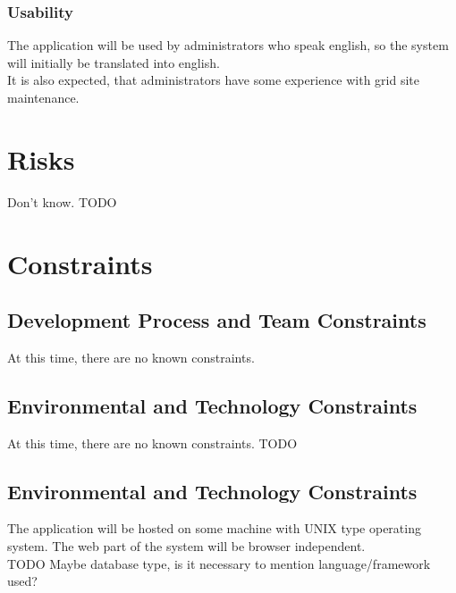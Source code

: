 \documentclass[12pt]{article}
\begin{document}
\subsubsection{Usability}
The application will be used by administrators who speak english, so the system will initially be translated into english.\\
It is also expected, that administrators have some experience with grid site maintenance.


\section{Risks}
Don't know. TODO


\section{Constraints}

\subsection{Development Process and Team Constraints}
At this time, there are no known constraints.

\subsection{Environmental and Technology Constraints}
At this time, there are no known constraints. TODO

\subsection{Environmental and Technology Constraints}
The application will be hosted on some machine with UNIX type operating system. The web part of the system will be browser independent.\\
TODO Maybe database type, is it necessary to mention language/framework used?
\end{document}
